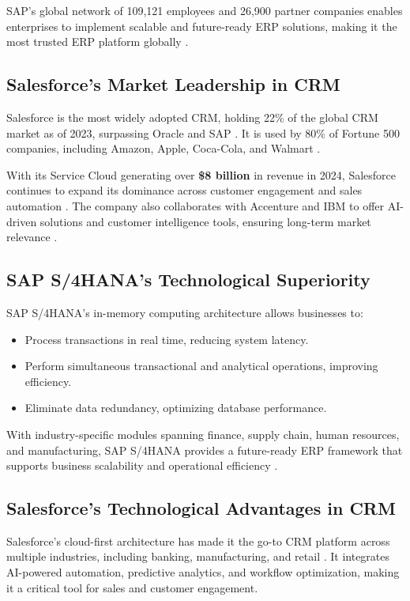 SAP’s global network of 109,121 employees and 26,900 partner companies enables enterprises to implement scalable and future-ready ERP solutions, making it the most trusted ERP platform globally \cite{sap_2025}.

\subsection{Salesforce’s Market Leadership in CRM}
Salesforce is the most widely adopted CRM, holding 22\% of the global CRM market as of 2023, surpassing Oracle and SAP \cite{statista_2023a}. It is used by 80\% of Fortune 500 companies, including Amazon, Apple, Coca-Cola, and Walmart \cite{routine_2023}.

With its Service Cloud generating over \textbf{\$8 billion} in revenue in 2024, Salesforce continues to expand its dominance across customer engagement and sales automation \cite{statista_2023b}. The company also collaborates with Accenture and IBM to offer AI-driven solutions and customer intelligence tools, ensuring long-term market relevance \cite{statista_2023a}.

\subsection{SAP S/4HANA’s Technological Superiority}
SAP S/4HANA’s in-memory computing architecture allows businesses to:
\begin{itemize}
    \item Process transactions in real time, reducing system latency.
    \item Perform simultaneous transactional and analytical operations, improving efficiency.
    \item Eliminate data redundancy, optimizing database performance.
\end{itemize}

With industry-specific modules spanning finance, supply chain, human resources, and manufacturing, SAP S/4HANA provides a future-ready ERP framework that supports business scalability and operational efficiency \cite{sap_2025}.

\subsection{Salesforce’s Technological Advantages in CRM}
Salesforce’s cloud-first architecture has made it the go-to CRM platform across multiple industries, including banking, manufacturing, and retail \cite{statista_2023c}. It integrates AI-powered automation, predictive analytics, and workflow optimization, making it a critical tool for sales and customer engagement.

